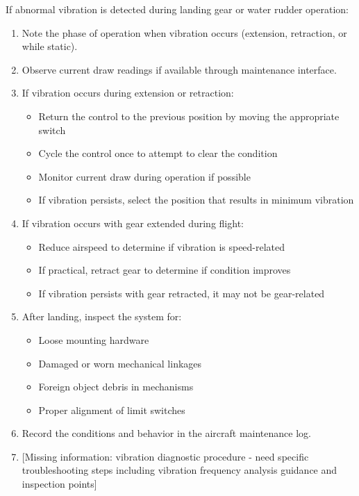 \documentclass[12pt,a4paper,twoside,openright]{book}
\begin{document}
If abnormal vibration is detected during landing gear or water rudder operation:

\begin{enumerate}
    \item Note the phase of operation when vibration occurs (extension, retraction, or while static).
    \item Observe current draw readings if available through maintenance interface.
    \item If vibration occurs during extension or retraction:
\begin{itemize}
        \item Return the control to the previous position by moving the appropriate switch
        \item Cycle the control once to attempt to clear the condition
        \item Monitor current draw during operation if possible
        \item If vibration persists, select the position that results in minimum vibration
\end{itemize}
    \item If vibration occurs with gear extended during flight:
\begin{itemize}
        \item Reduce airspeed to determine if vibration is speed-related
        \item If practical, retract gear to determine if condition improves
        \item If vibration persists with gear retracted, it may not be gear-related
\end{itemize}
    \item After landing, inspect the system for:
\begin{itemize}
        \item Loose mounting hardware
        \item Damaged or worn mechanical linkages
        \item Foreign object debris in mechanisms
        \item Proper alignment of limit switches
\end{itemize}
    \item Record the conditions and behavior in the aircraft maintenance log.
    \item {\color{red}[Missing information: vibration diagnostic procedure - need specific troubleshooting steps including vibration frequency analysis guidance and inspection points]}
\end{enumerate}
\end{document}
